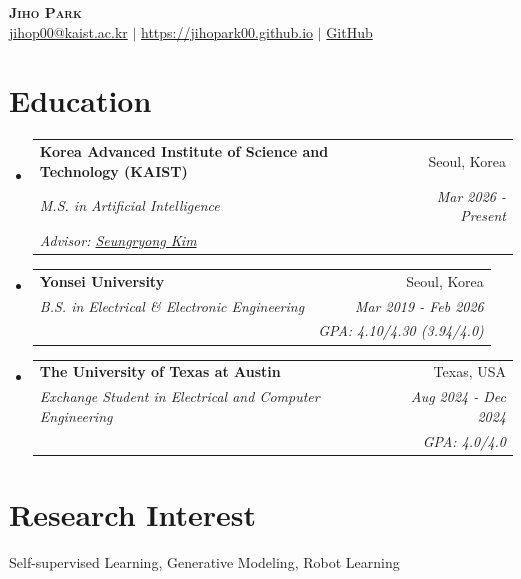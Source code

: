 \documentclass[letterpaper,11pt]{article}
\makeatletter
\newcommand{\resumeEducationHeading}[6]{
  \vspace{-2pt}\item
    \begin{tabular*}{0.97\textwidth}[t]{l@{\extracolsep{\fill}}r}
      \textbf{#1} & #2 \\
      \textit{\small#3} & \textit{\small #4} \\
      \textit{\small#5} & \textit{\small #6} \\
    \end{tabular*}\vspace{-5pt}
}
\newcommand{\resumeSubHeadingListStart}{\begin{itemize}[leftmargin=0.15in, label={}]}
\newcommand{\resumeSubHeadingListEnd}{\end{itemize}}
\newcommand{\resumeItemListStart}{\begin{itemize}}
\newcommand{\resumeItemListEnd}{\end{itemize}\vspace{-5pt}}
\makeatother
\begin{document}

\begin{center}
    \textbf{\Huge \scshape Jiho Park} \\ \vspace{3pt}
    \small
    \hspace{1pt}
    \href{mailto:jihop00@kaist.ac.kr}{jihop00@kaist.ac.kr}
    $|$
    \href{https://jihopark00.github.io/about/}{https://jihopark00.github.io}
    $|$
    \fagithub \hspace{.5pt} \href{https://github.com/jihopark00}{GitHub}

\end{center}






\section{Education}
  \vspace{3pt}
  \resumeSubHeadingListStart

    \resumeEducationHeading
      {Korea Advanced Institute of Science and Technology (KAIST)}{Seoul, Korea}
      {M.S. in Artificial Intelligence}{Mar 2026 - Present}
      {Advisor: \href{https://cvlab.kaist.ac.kr/}{Seungryong Kim}}{}

    \resumeEducationHeading
      {Yonsei University}{Seoul, Korea}
      {B.S. in Electrical \& Electronic Engineering}{Mar 2019 - Feb 2026}
      {}{GPA: 4.10/4.30 (3.94/4.0)}

    \resumeEducationHeading
      {The University of Texas at Austin}{Texas, USA}
      {Exchange Student in Electrical and Computer Engineering}{Aug 2024 - Dec 2024}
      {}{GPA: 4.0/4.0}

  \resumeSubHeadingListEnd
  
\vspace{-20pt}
\section{Research Interest}
\vspace{1pt}
Self-supervised Learning, Generative Modeling, Robot Learning
\resumeItemListStart
    \vspace{-5pt}
\resumeItemListEnd
\end{document}
